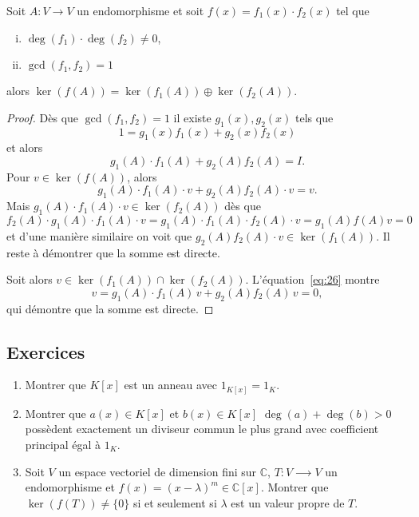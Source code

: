 \begin{theorem}
  \label{thr:37}
  Soit $A: V \rightarrow V$ un endomorphisme et soit $f(x) = f_1(x) \cdot f_2(x)$ tel que
  \begin{enumerate}[i)]
  \item $\deg(f_1) \cdot \deg(f_2) \neq 0$,
  \item $\gcd(f_1,f_2) = 1$ 
  \end{enumerate}
  alors 
  $
      \ker(f(A)) = \ker(f_1(A)) \oplus \ker(f_2(A)) 
   $.   
\end{theorem}
\begin{proof}
  Dès que $\gcd(f_1,f_2)=1$ il existe $g_1(x),g_2(x)$ tels que 
  \begin{displaymath}
    1 = g_1(x) f_1(x) + g_2(x) f_2(x)
  \end{displaymath}
  et alors 
  \begin{equation}
    \label{eq:26}   
    g_1(A) \cdot f_1(A) +  g_2(A) f_2(A) = I. 
  \end{equation}
  Pour $v \in \ker(f(A))$, alors 
\begin{displaymath}
   g_1(A) \cdot f_1(A) \cdot v  + g_2(A) f_2(A) \cdot v  = v. 
\end{displaymath}
Mais $g_1(A) \cdot f_1(A) \cdot v \in \ker(f_2(A))$  dès que 
\begin{displaymath}
  f_2(A) \cdot g_1(A) \cdot f_1(A) \cdot v =   g_1(A) \cdot f_1(A) ⋅ f_2(A) \cdot v = g_1(A) f(A) v = 0
\end{displaymath}
et d'une manière similaire on voit que $g_2(A) f_2(A) \cdot v \in \ker(f_1(A))$. Il reste à démontrer que la somme est directe. 

Soit alors $v ∈  \ker(f_1(A))  ∩  \ker(f_2(A))$.  L'équation~\eqref{eq:26} montre 
\begin{displaymath}
  v =  g_1(A) \cdot f_1(A) \, v+  g_2(A) f_2(A) \, v = 0,
\end{displaymath}
qui démontre que la somme est directe. 
\end{proof}






\subsection*{Exercices}
\label{sec:exercices}
\begin{enumerate}
\item Montrer que $K[x]$ est un anneau avec $1_{K[x]} = 1_K$.  
\item Montrer que  $a(x) \in K[x]$ et $b(x) \in K[x]$ $\deg(a)+\deg(b)>0$  possèdent exactement un diviseur commun le plus grand avec coefficient principal égal à $1_K$.  
\item Soit $V$ un espace vectoriel de dimension fini sur $ℂ$,  $T : V ⟶V$ un endomorphisme et $f(x) = (x - λ)^m ∈ ℂ[x]$. Montrer que $\ker(f(T)) \neq \{0\}$ si et seulement si $λ$ est un valeur propre de $T$. 
\end{enumerate}



